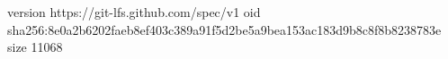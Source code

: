 version https://git-lfs.github.com/spec/v1
oid sha256:8e0a2b6202faeb8ef403c389a91f5d2be5a9bea153ac183d9b8c8f8b8238783e
size 11068
